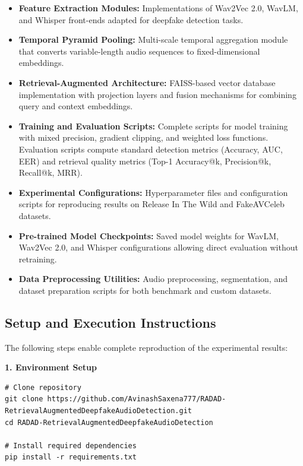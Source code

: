 \begin{itemize}
    \item \textbf{Feature Extraction Modules:} Implementations of Wav2Vec 2.0, WavLM, and Whisper front-ends adapted for deepfake detection tasks.
    
    \item \textbf{Temporal Pyramid Pooling:} Multi-scale temporal aggregation module that converts variable-length audio sequences to fixed-dimensional embeddings.
    
    \item \textbf{Retrieval-Augmented Architecture:} FAISS-based vector database implementation with projection layers and fusion mechanisms for combining query and context embeddings.
    
    \item \textbf{Training and Evaluation Scripts:} Complete scripts for model training with mixed precision, gradient clipping, and weighted loss functions. Evaluation scripts compute standard detection metrics (Accuracy, AUC, EER) and retrieval quality metrics (Top-1 Accuracy@k, Precision@k, Recall@k, MRR).
    
    \item \textbf{Experimental Configurations:} Hyperparameter files and configuration scripts for reproducing results on Release In The Wild and FakeAVCeleb datasets.
    
    \item \textbf{Pre-trained Model Checkpoints:} Saved model weights for WavLM, Wav2Vec 2.0, and Whisper configurations allowing direct evaluation without retraining.
    
    \item \textbf{Data Preprocessing Utilities:} Audio preprocessing, segmentation, and dataset preparation scripts for both benchmark and custom datasets.
\end{itemize}

\subsection{Setup and Execution Instructions}\label{apx:github_repo:setup}

The following steps enable complete reproduction of the experimental results:

\textbf{1. Environment Setup}

\begin{verbatim}
# Clone repository
git clone https://github.com/AvinashSaxena777/RADAD-RetrievalAugmentedDeepfakeAudioDetection.git
cd RADAD-RetrievalAugmentedDeepfakeAudioDetection

# Install required dependencies
pip install -r requirements.txt
\end{verbatim}

